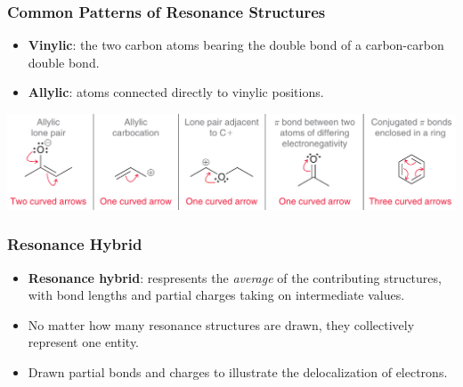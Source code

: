 \documentclass[12pt,a4paper]{article}
\begin{document}
\begin{itemize}
    \subsubsection{Common Patterns of Resonance Structures}
    \begin{itemize}
        \item \textbf{Vinylic}: the two carbon atoms bearing the double bond of a carbon-carbon double bond.
        \item \textbf{Allylic}: atoms connected directly to vinylic positions.
    \end{itemize}
    \begin{center}
        \includegraphics[scale=0.4]{images/patterns.png}
    \end{center}
    \subsubsection{Resonance Hybrid}
    \begin{itemize}
        \item \textbf{Resonance hybrid}: respresents the \textit{average} of the contributing structures, with bond lengths and partial charges taking on intermediate values.
        \item No matter how many resonance structures are drawn, they collectively represent one entity.
        \item Drawn partial bonds and charges to illustrate the delocalization of electrons.
    \end{itemize}

\end{itemize}
\end{document}
